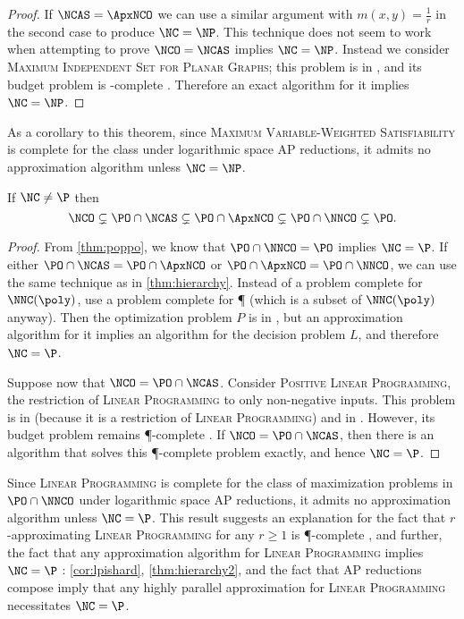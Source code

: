 \documentclass[]{article}
\begin{document}
\begin{proof}
  If $\NCAS = \ApxNCO$ we can use a similar argument with $m(x, y) = \frac{1}{r}$ in the second case to produce $\NC = \NP$.
  This technique does not seem to work when attempting to prove $\NCO = \NCAS$ implies $\NC = \NP$.
  Instead we consider \textsc{Maximum Independent Set for Planar Graphs}; this problem is in \NCAS{} \cite[Theorem~5.2.1]{dsst97}, and its budget problem is \NP-complete \cite{gj79}.
  Therefore an exact \NC{} algorithm for it implies $\NC = \NP$.
\end{proof}

As a corollary to this theorem, since \textsc{Maximum Variable-Weighted Satisfiability} is complete for the class \NNCO{} under logarithmic space AP reductions, it admits no \NC{} approximation algorithm unless $\NC = \NP$.

\begin{theorem}\label{thm:hierarchy2}
  If $\NC \neq \P$ then
  \begin{equation*}
    \NCO \subsetneq \PO \cap \NCAS \subsetneq \PO \cap \ApxNCO \subsetneq \PO \cap \NNCO \subsetneq \PO.
  \end{equation*}
\end{theorem}
\begin{proof}
  From \autoref{thm:poppo}, we know that $\PO \cap \NNCO = \PO$ implies $\NC = \P$.
  If either $\PO \cap \NCAS = \PO \cap \ApxNCO$ or $\PO \cap \ApxNCO = \PO \cap \NNCO$, we can use the same technique as in \autoref{thm:hierarchy}.
  Instead of a problem complete for $\NNC(\poly)$, use a problem complete for \P{} (which is a subset of $\NNC(\poly)$ anyway).
  Then the optimization problem $P$ is in \PO, but an \NC{} approximation algorithm for it implies an \NC{} algorithm for the decision problem $L$, and therefore $\NC = \P$.

  Suppose now that $\NCO = \PO \cap \NCAS$.
  Consider \textsc{Positive Linear Programming}, the restriction of \textsc{Linear Programming} to only non-negative inputs.
  This problem is in \PO{} (because it is a restriction of \textsc{Linear Programming}) and in \NCAS{} \cite{ln93}.
  However, its budget problem remains \P-complete \cite{tx98}.
  If $\NCO = \PO \cap \NCAS$, then there is an \NC{} algorithm that solves this \P-complete problem exactly, and hence $\NC = \P$.
\end{proof}

Since \textsc{Linear Programming} is complete for the class of maximization problems in $\PO \cap \NNCO$ under logarithmic space AP reductions, it admits no \NC{} approximation algorithm unless $\NC = \P$.
This result suggests an explanation for the fact that $r$-approximating \textsc{Linear Programming} for any $r \geq 1$ is \P-complete \cite[Theorem~8.2.7]{dsst97}, and further, the fact that any \NC{} approximation algorithm for \textsc{Linear Programming} implies $\NC = \P$ \cite[Theorem~8.2.8]{dsst97}: \autoref{cor:lpishard}, \autoref{thm:hierarchy2}, and the fact that AP reductions compose imply that any highly parallel approximation for \textsc{Linear Programming} necessitates $\NC = \P$.
\end{document}
